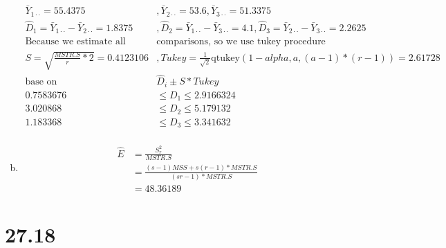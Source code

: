 \documentclass{article}\usepackage[]{graphicx}\usepackage[]{color}
\newenvironment{knitrout}{}{} %
\begin{document}
\begin{enumerate}[(a)]
\begin{knitrout}
\end{knitrout}

\begin{displaymath}
\begin{split}
\bar{Y}_{1\cdot \cdot} = 55.4375 &, \bar{Y}_{2\cdot \cdot} = 53.6 , \bar{Y}_{3\cdot \cdot} = 51.3375 \\
\hat{D}_1 = \bar{Y}_{1\cdot \cdot}-\bar{Y}_{2\cdot \cdot} = 1.8375 &,  \hat{D}_2 = \bar{Y}_{1\cdot \cdot}-\bar{Y}_{3\cdot \cdot}=4.1  , \hat{D}_3 = \bar{Y}_{2\cdot \cdot}-\bar{Y}_{3\cdot \cdot}=2.2625  \\
\text{Because we estimate all pairwise }& \text{comparisons, so we use tukey procedure}\\
S = \sqrt{\frac{MSTR.S}{r}*2} = 0.4123106 &, Tukey = \frac{1}{\sqrt{2}}\text{qtukey}(1-alpha, a, (a-1)*(r-1))=2.61728\\
\text{base on } &\hat{D}_i \pm S*Tukey\\
0.7583676 & \leq D_1 \leq 2.9166324  \\
3.020868 &\leq D_2 \leq 5.179132  \\
1.183368 &\leq D_3 \leq 3.341632   \\
\end{split}
\end{displaymath}

\item

\begin{displaymath}
\begin{split}
\hat{E} &= \frac{S_r^2}{MSTR.S} \\
        &= \frac{(s-1)MSS+s(r-1)*MSTR.S}{(sr-1)*MSTR.S}\\
        &= 48.36189
\end{split}
\end{displaymath}

\end{enumerate}

\section{27.18}
\end{document}
